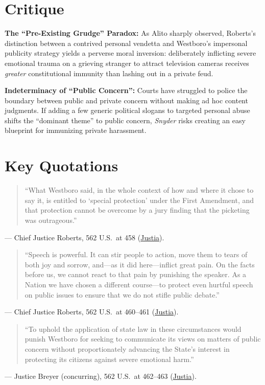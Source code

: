 \documentclass[12pt]{article}
\begin{document}
\section{Critique}
\textbf{The ``Pre-Existing Grudge'' Paradox:} As Alito sharply observed, Roberts's distinction between a contrived personal vendetta and Westboro's impersonal publicity strategy yields a perverse moral inversion: deliberately inflicting severe emotional trauma on a grieving stranger to attract television cameras receives \textit{greater} constitutional immunity than lashing out in a private feud.

\textbf{Indeterminacy of ``Public Concern'':} Courts have struggled to police the boundary between public and private concern without making ad hoc content judgments. If adding a few generic political slogans to targeted personal abuse shifts the ``dominant theme'' to public concern, \textit{Snyder} risks creating an easy blueprint for immunizing private harassment.

\section{Key Quotations}
\begin{quote}
``What Westboro said, in the whole context of how and where it chose to say it, is entitled to `special protection' under the First Amendment, and that protection cannot be overcome by a jury finding that the picketing was outrageous.''
\end{quote}
\noindent --- Chief Justice Roberts, 562 U.S.\ at 458 (\href{https://supreme.justia.com/cases/federal/us/562/443/}{Justia}).

\begin{quote}
``Speech is powerful. It can stir people to action, move them to tears of both joy and sorrow, and---as it did here---inflict great pain. On the facts before us, we cannot react to that pain by punishing the speaker. As a Nation we have chosen a different course---to protect even hurtful speech on public issues to ensure that we do not stifle public debate.''
\end{quote}
\noindent --- Chief Justice Roberts, 562 U.S.\ at 460--461 (\href{https://supreme.justia.com/cases/federal/us/562/443/}{Justia}).

\begin{quote}
``To uphold the application of state law in these circumstances would punish Westboro for seeking to communicate its views on matters of public concern without proportionately advancing the State's interest in protecting its citizens against severe emotional harm.''
\end{quote}
\noindent --- Justice Breyer (concurring), 562 U.S.\ at 462--463 (\href{https://supreme.justia.com/cases/federal/us/562/443/}{Justia}).
\end{document}
